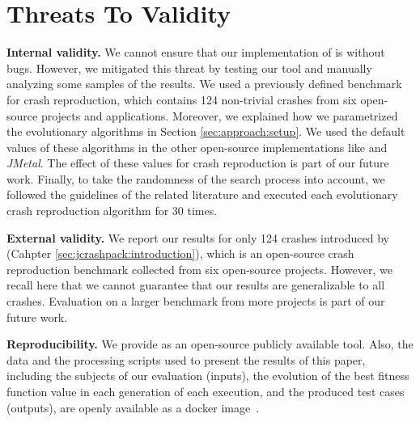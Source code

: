 \section{Threats To Validity}
\label{sec:threats}


\textbf{Internal validity.}
We cannot ensure that our implementation of \botsing is without bugs. However, we mitigated this threat by testing our tool and manually analyzing some samples of the results. We used a previously defined benchmark for crash reproduction, which contains 124 non-trivial crashes from six open-source projects and applications.  Moreover, we explained how we parametrized the evolutionary algorithms in Section \ref{sec:approach:setup}. We used the default values of these algorithms in the other open-source implementations like \evosuite and \textit{JMetal}. The effect of these values for crash reproduction is part of our future work. Finally, to take the randomness of the search process into account, we followed the guidelines of the related literature \cite{Arcuri2014} and executed each evolutionary crash reproduction algorithm for 30 times.


\textbf{External validity.}
We report our results for only 124 crashes introduced by \crashpack (Cahpter \ref{sec:jcrashpack:introduction}), which is an open-source crash reproduction benchmark collected from six open-source projects. However, we recall here that we cannot guarantee that our results are generalizable to all crashes. Evaluation \moho on a larger benchmark from more projects is part of our future work.


\textbf{Reproducibility.}
We provide \botsing as an open-source publicly available tool. Also, the data and the processing scripts used to present the results of this paper, including the subjects of our evaluation (inputs), the evolution of the best fitness function value in each generation of each execution, and the produced test cases (outputs), are openly available as a docker image~\cite{zenodoRP}. 